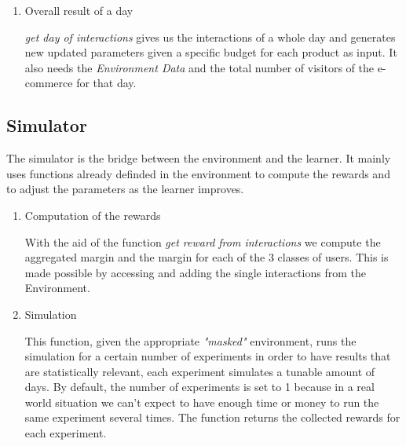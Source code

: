 \begin{enumerate}
            \item Overall result of a day
    
                \textit{get day of interactions} gives us the interactions of a whole day and generates new updated parameters given a specific budget for each product as input. It also needs the \textit{Environment Data} and the total number of visitors of the e-commerce for that day.
        \end{enumerate}

    \subsection{Simulator}
    The simulator is the bridge between the environment and the learner. It mainly uses functions already definded in the environment to compute the rewards and to adjust the parameters as the learner improves.
    
        \begin{enumerate}
            \item Computation of the rewards
     
                With the aid of the function \textit{get reward from interactions} we compute the aggregated margin and the margin for each of the 3 classes of users. This is made possible by accessing and adding the single interactions from the Environment.
     
            \item Simulation
     
                This function, given the appropriate \textit{"masked"} environment, runs the simulation for a certain number of experiments in order to have results that are statistically relevant, each experiment simulates a tunable amount of days. By default, the number of experiments is set to 1 because in a real world situation we can't expect to have enough time or money to run the same experiment several times. The function returns the collected rewards for each experiment.
        \end{enumerate}
